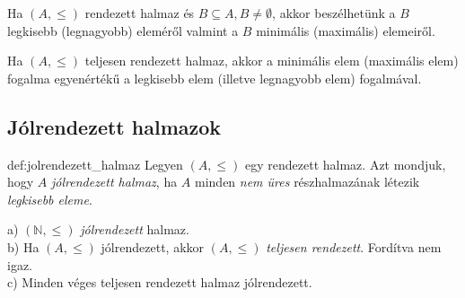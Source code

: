 Ha $(A,\leq)$ rendezett halmaz és $B\subseteq A,B\neq\emptyset$,
akkor beszélhetünk a $B$ legkisebb (legnagyobb) eleméről valmint
a $B$ minimális (maximális) elemeiről.

Ha $(A,\leq)$ teljesen rendezett halmaz, akkor a minimális elem (maximális
elem) fogalma egyenértékű a legkisebb elem (illetve legnagyobb elem)
fogalmával.

\subsection*{Jólrendezett halmazok}
\begin{definition}{def:jolrendezett_halmaz}
Legyen $(A,\leq)$ egy rendezett halmaz. Azt mondjuk, hogy $A$ \emph{jólrendezett
halmaz}, ha $A$ minden \emph{nem üres} részhalmazának létezik \emph{legkisebb
eleme}. 
\end{definition}

\begin{rem}
a) $(\mathbb{N},\leq)$ \emph{jólrendezett} halmaz.\\
 b) Ha $(A,\leq)$ jólrendezett, akkor $(A,\leq)$ \emph{teljesen
rendezett}. Fordítva nem igaz.\\
 c) Minden véges teljesen rendezett halmaz jólrendezett. 
\end{rem}

